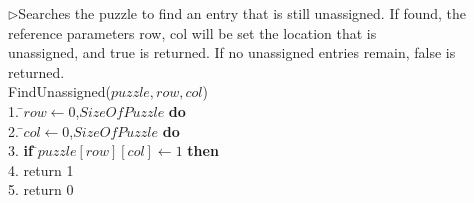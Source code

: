 \documentclass[12pt, letterpaper, twoside]{article}
\begin{document}
            \begin{center}
            \begin{tabbing}
            $\rhd$Searches the puzzle to find an entry that is still unassigned. If
               found, the\\ reference parameters row, col will be set the location
               that is\\ unassigned, and true is returned. If no unassigned entries
               remain, false is returned.\\
            FindUnassigned($puzzle, row, col $) \\
            1.  \=$row \leftarrow 0$,$SizeOfPuzzle$ {\bf do} \\
            2. \indent            {} \=$col \leftarrow 0$,$SizeOfPuzzle$ {\bf do} \\
            3. \indent 	      \> 	\>  {\bf if} \=$puzzle[row][col] \leftarrow 1$ {\bf then} \\
            4. \indent            \>		 \>	\> return 1\\
            5. \indent return 0 \\
            \end{tabbing}
            \label{fig_alg_ex}
            \end{center}
\end{document}
